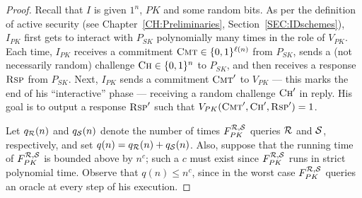 \begin{proof}
Recall that $I$ is given $1^n$, $PK$ and some random bits. As per the
definition of active security (see Chapter~\ref{CH:Preliminaries},
Section~\ref{SEC:IDschemes}), $I_{PK}$ first gets to interact with $P_{SK}$
polynomially many times in the role of $V_{PK}$. Each time, $I_{PK}$ receives
a commitment $\textsc{Cmt} \in \{0,1\}^{\ell(n)}$ from $P_{SK}$, sends a
(not necessarily random) challenge $\textsc{Ch} \in \{0,1\}^{n}$ to $P_{SK}$, and
then receives a response $\textsc{Rsp}$ from $P_{SK}$. Next, $I_{PK}$ sends
a commitment $\textsc{Cmt}'$ to $V_{PK}$ --- this marks the end of his
``interactive'' phase --- receiving a random challenge $\textsc{Ch}'$ in
reply. His goal is to output a response $\textsc{Rsp}'$ such that
$V_{PK}(\textsc{Cmt}',\textsc{Ch}',\textsc{Rsp}') = 1$.

Let $q_{\mathcal{R}}(n)$ and $q_{\mathcal{S}}(n)$ denote the number of times
$F^{\mathcal{R},\mathcal{S}}_{PK}$ queries $\mathcal{R}$ and $\mathcal{S}$, respectively, and set
$q(n) = q_{\mathcal{R}}(n) + q_{\mathcal{S}}(n)$. Also, suppose that the running time of
$F^{\mathcal{R},\mathcal{S}}_{PK}$ is bounded above by $n^c$; such a $c$ must exist since
$F^{\mathcal{R},\mathcal{S}}_{PK}$ runs in strict polynomial time. Observe that $q(n) \leq
n^c$, since in the worst case $F^{\mathcal{R},\mathcal{S}}_{PK}$ queries an oracle at
every step of his execution.


\end{proof}
